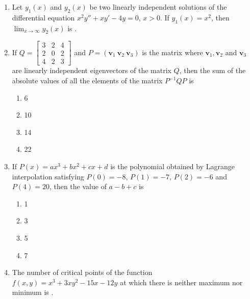 \documentclass[journal,12pt,onecolumn]{IEEEtran}
\newcommand{\myvec}[1]{\begin{bmatrix}#1\end{bmatrix}}
\begin{document}
\begin{enumerate}[label=\arabic*)]
\vspace{0.5cm}

\item Let $y_1(x)$ and $y_2(x)$ be two linearly independent solutions of the differential equation $x^2y''+xy'-4y=0$, $x>0$. If $y_1(x)=x^2$, then $\displaystyle \lim_{x\to\infty} y_2(x)$ is \underline{\hspace{2cm}}.
\hfill{} \\

\vspace{0.5cm}

\item If 
$Q = \myvec{3 & 2 & 4 \\ 2 & 0 & 2 \\ 4 & 2 & 3}$ and $P=(\mathbf{v}_1\ \mathbf{v}_2\ \mathbf{v}_3)$ is the matrix where $\mathbf{v}_1, \mathbf{v}_2$ and $\mathbf{v}_3$ are linearly independent eigenvectors of the matrix $Q$, then the sum of the absolute values of all the elements of the matrix $P^{-1}QP$ is
\hfill{} \\

\vspace{0.2cm}
\begin{enumerate}[label=\alph*)]
\item 6
\item 10
\item 14
\item 22
\end{enumerate}

\vspace{0.5cm}

\item If $P(x)=a x^3+b x^2+c x+d$ is the polynomial obtained by Lagrange interpolation satisfying $P(0)=-8$, $P(1)=-7$, $P(2)=-6$ and $P(4)=20$, then the value of $a-b+c$ is
\hfill{} \\

\vspace{0.2cm}
\begin{enumerate}[label=\alph*)]
\item 1
\item 3
\item 5
\item 7
\end{enumerate}

\vspace{0.5cm}

\item The number of critical points of the function $f(x,y)=x^3+3xy^2-15x-12y$ at which there is neither maximum nor minimum is \underline{\hspace{2cm}}.
\hfill{} \\


\end{enumerate}
\end{document}
